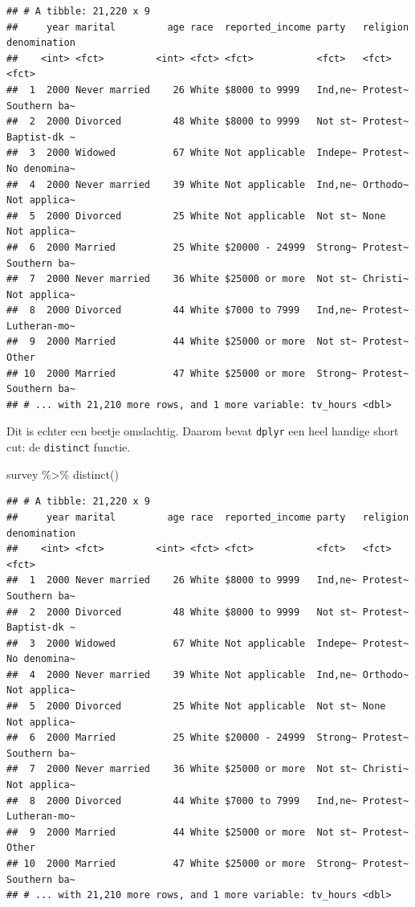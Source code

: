\documentclass[]{tufte-book}
\newenvironment{Shaded}{}{}
\newcommand{\FunctionTok}[1]{\textcolor[rgb]{0.02,0.16,0.49}{#1}}
\newcommand{\NormalTok}[1]{#1}
\newcommand{\SpecialCharTok}[1]{\textcolor[rgb]{0.25,0.44,0.63}{#1}}
\begin{document}
\begin{verbatim}
## # A tibble: 21,220 x 9
##     year marital         age race  reported_income party   religion denomination
##    <int> <fct>         <int> <fct> <fct>           <fct>   <fct>    <fct>       
##  1  2000 Never married    26 White $8000 to 9999   Ind,ne~ Protest~ Southern ba~
##  2  2000 Divorced         48 White $8000 to 9999   Not st~ Protest~ Baptist-dk ~
##  3  2000 Widowed          67 White Not applicable  Indepe~ Protest~ No denomina~
##  4  2000 Never married    39 White Not applicable  Ind,ne~ Orthodo~ Not applica~
##  5  2000 Divorced         25 White Not applicable  Not st~ None     Not applica~
##  6  2000 Married          25 White $20000 - 24999  Strong~ Protest~ Southern ba~
##  7  2000 Never married    36 White $25000 or more  Not st~ Christi~ Not applica~
##  8  2000 Divorced         44 White $7000 to 7999   Ind,ne~ Protest~ Lutheran-mo~
##  9  2000 Married          44 White $25000 or more  Not st~ Protest~ Other       
## 10  2000 Married          47 White $25000 or more  Strong~ Protest~ Southern ba~
## # ... with 21,210 more rows, and 1 more variable: tv_hours <dbl>
\end{verbatim}

Dit is echter een beetje omslachtig. Daarom bevat \texttt{dplyr} een heel handige short cut: de \texttt{distinct} functie.

\begin{Shaded}
\begin{Highlighting}[]
\NormalTok{survey }\SpecialCharTok{\%\textgreater{}\%}
  \FunctionTok{distinct}\NormalTok{()}
\end{Highlighting}
\end{Shaded}

\begin{verbatim}
## # A tibble: 21,220 x 9
##     year marital         age race  reported_income party   religion denomination
##    <int> <fct>         <int> <fct> <fct>           <fct>   <fct>    <fct>       
##  1  2000 Never married    26 White $8000 to 9999   Ind,ne~ Protest~ Southern ba~
##  2  2000 Divorced         48 White $8000 to 9999   Not st~ Protest~ Baptist-dk ~
##  3  2000 Widowed          67 White Not applicable  Indepe~ Protest~ No denomina~
##  4  2000 Never married    39 White Not applicable  Ind,ne~ Orthodo~ Not applica~
##  5  2000 Divorced         25 White Not applicable  Not st~ None     Not applica~
##  6  2000 Married          25 White $20000 - 24999  Strong~ Protest~ Southern ba~
##  7  2000 Never married    36 White $25000 or more  Not st~ Christi~ Not applica~
##  8  2000 Divorced         44 White $7000 to 7999   Ind,ne~ Protest~ Lutheran-mo~
##  9  2000 Married          44 White $25000 or more  Not st~ Protest~ Other       
## 10  2000 Married          47 White $25000 or more  Strong~ Protest~ Southern ba~
## # ... with 21,210 more rows, and 1 more variable: tv_hours <dbl>
\end{verbatim}
\end{document}
